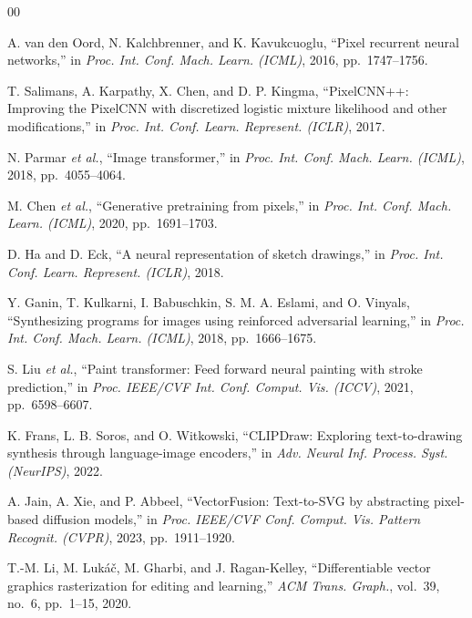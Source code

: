 \documentclass[conference]{IEEEtran}
\begin{document}
\begin{thebibliography}{00}

A. van den Oord, N. Kalchbrenner, and K. Kavukcuoglu,
``Pixel recurrent neural networks,''
in \textit{Proc. Int. Conf. Mach. Learn. (ICML)}, 2016, pp.~1747--1756.

T. Salimans, A. Karpathy, X. Chen, and D. P. Kingma,
``PixelCNN++: Improving the PixelCNN with discretized logistic mixture
likelihood and other modifications,''
in \textit{Proc. Int. Conf. Learn. Represent. (ICLR)}, 2017.

N. Parmar \textit{et al.},
``Image transformer,''
in \textit{Proc. Int. Conf. Mach. Learn. (ICML)}, 2018, pp.~4055--4064.

M. Chen \textit{et al.},
``Generative pretraining from pixels,''
in \textit{Proc. Int. Conf. Mach. Learn. (ICML)}, 2020, pp.~1691--1703.

D. Ha and D. Eck,
``A neural representation of sketch drawings,''
in \textit{Proc. Int. Conf. Learn. Represent. (ICLR)}, 2018.

Y. Ganin, T. Kulkarni, I. Babuschkin, S. M. A. Eslami, and O. Vinyals,
``Synthesizing programs for images using reinforced adversarial
learning,''
in \textit{Proc. Int. Conf. Mach. Learn. (ICML)}, 2018, pp.~1666--1675.

S. Liu \textit{et al.},
``Paint transformer: Feed forward neural painting with stroke
prediction,''
in \textit{Proc. IEEE/CVF Int. Conf. Comput. Vis. (ICCV)}, 2021,
pp.~6598--6607.

K. Frans, L. B. Soros, and O. Witkowski,
``CLIPDraw: Exploring text-to-drawing synthesis through language-image
encoders,''
in \textit{Adv. Neural Inf. Process. Syst. (NeurIPS)}, 2022.

A. Jain, A. Xie, and P. Abbeel,
``VectorFusion: Text-to-SVG by abstracting pixel-based diffusion
models,''
in \textit{Proc. IEEE/CVF Conf. Comput. Vis. Pattern Recognit. (CVPR)},
2023, pp.~1911--1920.

T.-M. Li, M. Luk{\'a}{\v c}, M. Gharbi, and J. Ragan-Kelley,
``Differentiable vector graphics rasterization for editing and
learning,''
\textit{ACM Trans. Graph.}, vol.~39, no.~6, pp.~1--15, 2020.


\end{thebibliography}
\end{document}
